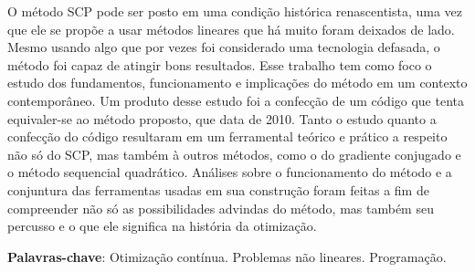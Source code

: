 
\begin{resumo}



  O método SCP pode ser posto em uma condição histórica renascentista, uma vez que ele se propõe a usar métodos lineares que há muito foram deixados de lado. Mesmo usando algo que por vezes foi considerado uma tecnologia defasada, o método foi capaz de atingir bons resultados. Esse trabalho tem como foco o estudo dos fundamentos, funcionamento e implicações do método em um contexto contemporâneo. Um produto desse estudo foi a confecção de um código que tenta equivaler-se ao método proposto, que data de 2010. Tanto o estudo quanto a confecção do código resultaram em um ferramental teórico e prático a respeito não só do SCP, mas também à outros métodos, como o do gradiente conjugado e o método sequencial quadrático. Análises sobre o funcionamento do método e a conjuntura das ferramentas usadas em sua construção foram feitas a fim de compreender não só as possibilidades advindas do método, mas também seu percusso e o que ele significa na história da otimização. 



  \vspace{0.7cm}
  \textbf{Palavras-chave}: Otimização contínua. Problemas não lineares. Programação.

\end{resumo}
